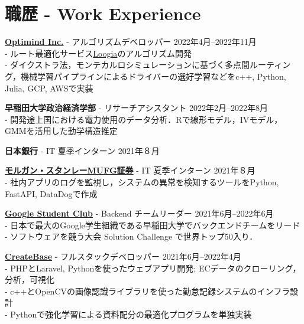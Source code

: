 \documentclass[uplatex,dvipdfmx,a4paper,11pt]{jsarticle}
\begin{document}


\section{職歴 - Work Experience}

{\bf \href{https://www.optimind.tech/}{Optimind Inc.}} { - アルゴリズムデベロッパー} \hfill {2022年4月--2022年11月} 
\\- ルート最適化サービス\href{https://loogia.jp/?_ga=2.72237267.1726635224.1669133714-1962149220.1665458028}{Loogia}のアルゴリズム開発
\\- ダイクストラ法，モンテカルロシミュレーションに基づく多点間ルーティング，機械学習パイプラインによるドライバーの選好学習などをc++, Python, Julia, GCP, AWSで実装

{ \bf\textcolor{blue(pigment)}{早稲田大学政治経済学部}} { - リサーチアシスタント} \hfill {2022年2月--2022年8月} 
\\- 開発途上国における電力使用のデータ分析．Rで線形モデル，IVモデル，GMMを活用した動学構造推定

{\bf\textcolor{blue(pigment)}{日本銀行}}{ - IT 夏季インターン} \hfill { 2021年８月} 

{\bf \href{https://www.morganstanley.co.jp/ja}{モルガン・スタンレーMUFG証券}}{ - IT 夏季インターン} \hfill {2021年８月} 
\\- 社内アプリのログを監視し，システムの異常を検知するツールをPython, FastAPI, DataDogで作成

{ \bf\href{https://gdsc.community.dev/waseda-university/}{Google Student Club}} { - Backend チームリーダー} \hfill {2021年6月--2022年6月} 
\\- 日本で最大のGoogle学生組織である早稲田大学でバックエンドチームをリード
\\- ソフトウェアを競う大会 Solution Challenge で世界トップ50入り．

{\bf \href{https://createbase.work/}{CreateBase}} { - フルスタックデベロッパー} \hfill {2021年6月--2022年4月} 
\\- PHPとLaravel, Pythonを使ったウェブアプリ開発; ECデータのクローリング，分析，可視化
\\- c++とOpenCVの画像認識ライブラリを使った勤怠記録システムのインフラ設計
\\- Pythonで強化学習による資料配分の最適化プログラムを単独実装
\end{document}
